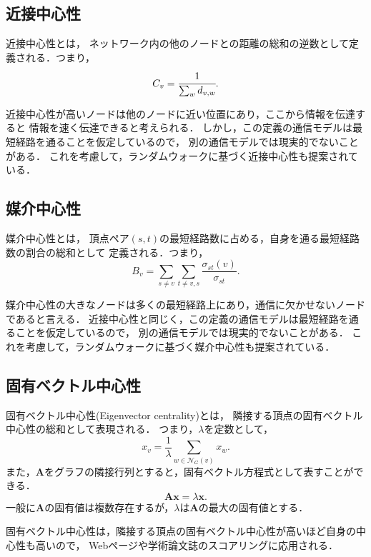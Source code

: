 \subsection{近接中心性}
\label{subsect:closeness}

近接中心性\cite{Bavelas1948,Beauchamp1965}とは，
ネットワーク内の他のノードとの距離の総和の逆数として定義される．つまり，
\begin{equation*}
  C_v=\cfrac{1}{\sum_wd_{v,w}}.
\end{equation*}

近接中心性が高いノードは他のノードに近い位置にあり，ここから情報を伝達すると
情報を速く伝達できると考えられる．
しかし，この定義の通信モデルは最短経路を通ることを仮定しているので，
別の通信モデルでは現実的でないことがある．
これを考慮して，ランダムウォークに基づく近接中心性も提案されている\cite{White2003}．

\subsection{媒介中心性}
\label{subsect:betweenness}

媒介中心性\cite{Anthonisse1971,Freeman1977}とは，
頂点ペア$(s,t)$の最短経路数に占める，自身を通る最短経路数の割合の総和として
定義される．つまり，
\begin{equation*}
  B_v=\sum_{s\neq v}\sum_{t\neq {v,s}}\frac{\sigma_{st}(v)}{\sigma_{st}}.
\end{equation*}

媒介中心性の大きなノードは多くの最短経路上にあり，通信に欠かせないノードであると言える．
近接中心性と同じく，この定義の通信モデルは最短経路を通ることを仮定しているので，
別の通信モデルでは現実的でないことがある．
これを考慮して，ランダムウォークに基づく媒介中心性も提案されている\cite{Newman2005}．

\subsection{固有ベクトル中心性}
\label{subsect:eigenvector}

固有ベクトル中心性(Eigenvector centrality)\cite{Bonacich1991}とは，
隣接する頂点の固有ベクトル中心性の総和として表現される．
つまり，$\lambda$を定数として，
\begin{equation*}
  x_v=\frac{1}{\lambda}\sum_{w\in\mathcal{N}_G(v)}x_w.
\end{equation*}
また，$\mathbf{A}$をグラフの隣接行列とすると，固有ベクトル方程式として表すことができる．
\begin{equation*}
  \mathbf{A}\mathbf{x}=\lambda\mathbf{x}.
\end{equation*}
一般に$\mathbf{A}$の固有値は複数存在するが，$\lambda$は$\mathbf{A}$の最大の固有値とする．

固有ベクトル中心性は，隣接する頂点の固有ベクトル中心性が高いほど自身の中心性も高いので，
Webページや学術論文誌のスコアリングに応用される．
